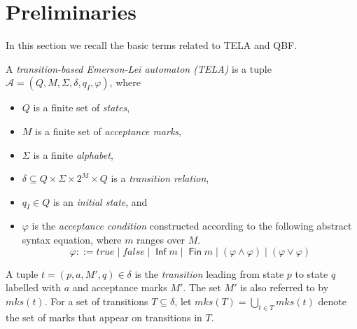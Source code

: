 \documentclass[a4paper,UKenglish,cleveref,autoref,thm-restate]{lipics-v2021}
\DeclareMathOperator{\Inf}{\mathsf{Inf}}
\DeclareMathOperator{\Fin}{\mathsf{Fin}}
\newcommand{\minf}{\mathit{inf}}
\newcommand{\mks}{\mathit{mks}}
\def\false{\mathit{false}}
\def\true{\mathit{true}}
\newcommand{\mA}{\mathcal{A}}
\begin{document}

\section{Preliminaries}\label{sec:prelim}

In this section we recall the basic terms related to TELA and QBF.

\begin{definition}[TELA]
  A \emph{transition-based Emerson-Lei automaton (TELA)} is a tuple
  $\mA =(Q,M,\Sigma,\delta,q_I,\varphi)$, where
  \begin{itemize}
  \item $Q$ is a finite set of \emph{states},
  \item $M$ is a finite set of \emph{acceptance marks},
  \item $\Sigma$ is a finite \emph{alphabet},
  \item $\delta \subseteq Q \times \Sigma \times 2^{M} \times Q$ is a
    \emph{transition relation},
  \item $q_I\in Q$ is an \emph{initial state}, and
  \item $\varphi$ is the \emph{acceptance condition} constructed
    according to the following abstract syntax equation, where $m$
    ranges over $M$.
    $$\varphi ::= \true \mid \false \mid \Inf m \mid \Fin m \mid \left( \varphi \land \varphi \right) \mid \left( \varphi \lor \varphi \right)$$
\end{itemize}
\end{definition}

A tuple $t=(p,a,M',q)\in\delta$ is the \emph{transition} leading from
state $p$ to state $q$ labelled with $a$ and acceptance marks $M'$.
The set $M'$ is also referred to by $\mks(t)$. For a set of transitions
$T\subseteq\delta$, let $\mks(T)=\bigcup_{t\in T}\mks(t)$ denote the
set of marks that appear on transitions in $T$.
\end{document}
